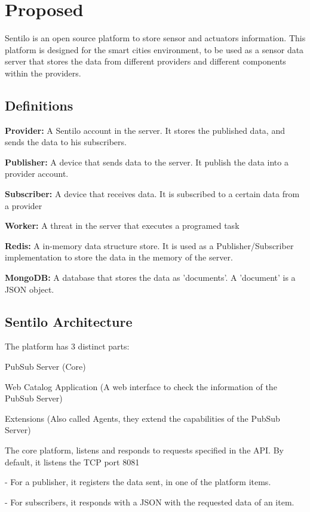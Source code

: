\section{Proposed} \label{sec:Approach}

Sentilo is an open source platform to store sensor and actuators information.
This platform is designed for the smart cities environment,
	to be used as a sensor data server that stores the data from different providers and different components within the providers.

\subsection{Definitions}

\textbf{Provider:} A Sentilo account in the server. It stores the published data, and
sends the data to his subscribers.

\textbf{Publisher:} A device that sends data to the server. It publish the data into a
provider account.

\textbf{Subscriber:} A device that receives data. It is subscribed to a certain data from a
provider

\textbf{Worker:} A threat in the server that executes a programed task

\textbf{Redis:} A in-memory data structure store. It is used as a Publisher/Subscriber
implementation to store the data in the memory of the server.

\textbf{MongoDB:} A database that stores the data as 'documents'. A 'document' is a
JSON object.


\subsection{Sentilo Architecture}

The platform has 3 distinct parts:

PubSub Server (Core)

Web Catalog Application (A web interface to check the information of the
PubSub Server)

Extensions (Also called Agents, they extend the capabilities of the PubSub
Server)

The core platform, listens and responds to requests specified in the API. By default,
it listens the TCP port 8081

- For a publisher, it registers the data sent, in one of the platform items.

- For subscribers, it responds with a JSON with the requested data of an item.

